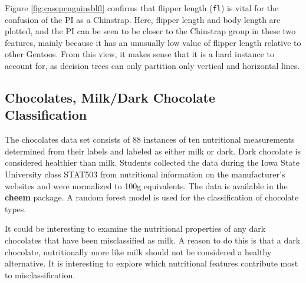 \documentclass[11pt,twoside]{article}
\begin{document}
Figure \ref{fig:casepenguinsblfl} confirms that flipper length (\texttt{fl}) is vital for the confusion of the PI as a Chinstrap. Here, flipper length and body length are plotted, and the PI can be seen to be closer to the Chinstrap group in these two features, mainly because it has an unusually low value of flipper length relative to other Gentoos. From this view, it makes sense that it is a hard instance to account for, as decision trees can only partition only vertical and horizontal lines.

\hypertarget{chocolates-milkdark-chocolate-classification}{%
\subsection{Chocolates, Milk/Dark Chocolate Classification}\label{chocolates-milkdark-chocolate-classification}}

The chocolates data set consists of 88 instances of ten nutritional measurements determined from their labels and labeled as either milk or dark. Dark chocolate is considered healthier than milk. Students collected the data during the Iowa State University class STAT503 from nutritional information on the manufacturer's websites and were normalized to 100g equivalents. The data is available in the \textbf{cheem} package. A random forest model is used for the classification of chocolate types.

It could be interesting to examine the nutritional properties of any dark chocolates that have been misclassified as milk. A reason to do this is that a dark chocolate, nutritionally more like milk should not be considered a healthy alternative. It is interesting to explore which nutritional features contribute most to misclassification.
\end{document}
